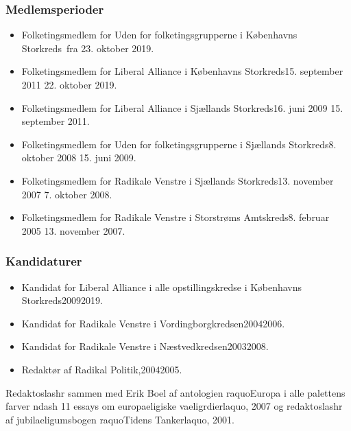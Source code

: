 \documentclass[11pt, a4paper]{awesome-cv}
\begin{document}
\begin{cvletter}
\subsubsection*{Medlemsperioder}
\begin{itemize}
\item Folketingsmedlem for Uden for folketingsgrupperne i Københavns Storkreds fra 23. oktober 2019.
\item Folketingsmedlem for Liberal Alliance i Københavns Storkreds15. september 2011  22. oktober 2019.
\item Folketingsmedlem for Liberal Alliance i Sjællands Storkreds16. juni 2009  15. september 2011.
\item Folketingsmedlem for Uden for folketingsgrupperne i Sjællands Storkreds8. oktober 2008  15. juni 2009.
\item Folketingsmedlem for Radikale Venstre i Sjællands Storkreds13. november 2007  7. oktober 2008.
\item Folketingsmedlem for Radikale Venstre i Storstrøms Amtskreds8. februar 2005  13. november 2007.
\end{itemize}
\subsubsection*{Kandidaturer}
\begin{itemize}
\item Kandidat for Liberal Alliance i alle opstillingskredse i Københavns Storkreds20092019.
\item Kandidat for Radikale Venstre i Vordingborgkredsen20042006.
\item Kandidat for Radikale Venstre i Næstvedkredsen20032008.
\end{itemize}
\begin{itemize}
\item Redaktør af Radikal Politik,20042005.
\end{itemize}
Redaktoslashr sammen med Erik Boel af antologien raquoEuropa i alle palettens farver ndash 11 essays om europaeligiske vaeligrdierlaquo, 2007 og redaktoslashr af jubilaeligumsbogen raquoTidens Tankerlaquo, 2001.

\end{cvletter}
\end{document}
